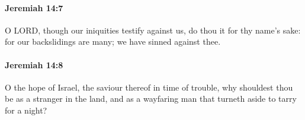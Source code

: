 		\paragraph{Jeremiah 14:7} %
			\label{JEREMIAH-14-7}

			O LORD, though our iniquities testify against us, do thou it for thy name’s sake: for our backslidings are many; we have sinned against thee.


		\paragraph{Jeremiah 14:8} %
			\label{JEREMIAH-14-8}

			O the hope of Israel, the saviour thereof in time of trouble, why shouldest thou be as a stranger in the land, and as a wayfaring man that turneth aside to tarry for a night?


